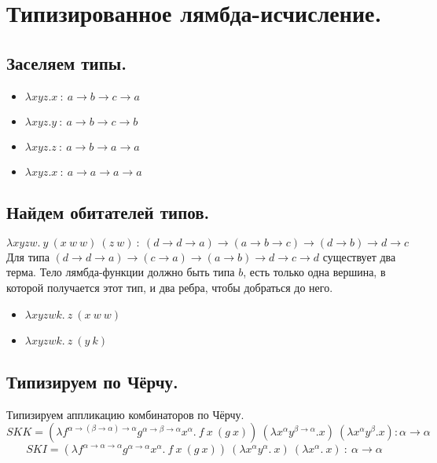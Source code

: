 \documentclass[a4paper,12pt]{article}
\date{ВШЭ ПМИ, 2022 г.}
\author{Алексей Косенко}
\theoremstyle{plain} %
\theoremstyle{definition} %
\theoremstyle{remark} %
\begin{document}
\maketitle

\section{Типизированное лямбда-исчисление.}
\subsection{Заселяем типы.}
\begin{itemize}
    \item $\lambda xyz.x \ : \ a \rightarrow b \rightarrow c \rightarrow a$
    \item $\lambda xyz.y \ : \ a \rightarrow b \rightarrow c \rightarrow b$
    \item $\lambda xyz.z \ : \ a \rightarrow b \rightarrow a \rightarrow a$
    \item $\lambda xyz.x \ : \ a \rightarrow a \rightarrow a \rightarrow a$
\end{itemize}

\subsection{Найдем обитателей типов.}
$\lambda xyzw. \ y \ (x \ w \ w) \ (z \ w) \ : \ (d \rightarrow d \rightarrow a) \rightarrow (a \rightarrow b \rightarrow c) \rightarrow (d \rightarrow b) \rightarrow d \rightarrow c$
\\

Для типа $(d \rightarrow d \rightarrow a) \rightarrow (c \rightarrow a) \rightarrow (a \rightarrow b) \rightarrow d \rightarrow c \rightarrow d$ существует два терма. Тело лямбда-функции должно быть типа $b$, есть только одна вершина, в которой получается этот тип, и два ребра, чтобы добраться до него.
\begin{itemize}
    \item $\lambda xyzwk. \ z \ (x \ w \ w)$
    \item $\lambda xyzwk. \ z \ (y \ k)$ 
\end{itemize}

\subsection{Типизируем по Чёрчу.}
Типизируем аппликацию комбинаторов по Чёрчу. 
$$S K K = (\lambda f^{\alpha \rightarrow (\beta \rightarrow \alpha) \rightarrow \alpha} g^{\alpha \rightarrow \beta \rightarrow \alpha} x^{\alpha}. \ f \ x \ (g \ x)) \ (\lambda x^{\alpha} y^{\beta \rightarrow \alpha}. x) \ (\lambda x^{\alpha} y^{\beta}. x) : \alpha \rightarrow \alpha$$
$$SKI = (\lambda f^{\alpha \rightarrow \alpha \rightarrow \alpha} g^{\alpha \rightarrow \alpha} x^{\alpha}. \ f \ x \ (g \ x)) \ (\lambda x^{\alpha} y^{\alpha}. \ x) \ (\lambda x^{\alpha}. \ x) \ : \ \alpha \rightarrow \alpha$$
\end{document}
